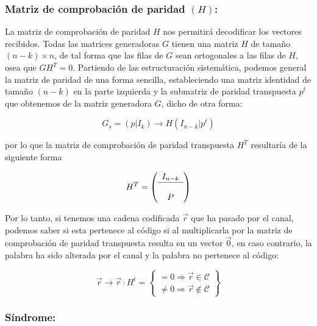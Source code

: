 \documentclass{article}
\begin{document}
\subsubsection{Matriz de comprobación de paridad $(H)$:} 

La matriz de comprobación de paridad $H$ nos permitirá decodificar los vectores recibidos. Todas las matrices generadoras $G$ tienen una matriz $H$ de tamaño $(n-k)\times n$, de tal forma que las filas de $G$ sean ortogonales a las filas de $H$, osea que $GH^T = 0$. Partiendo de las estructuración sistemática, podemos general la matriz de paridad de una forma sencilla, estableciendo una matriz identidad de tamaño $(n-k)$ en la parte izquierda y la submatriz de paridad transpuesta $p^t$ que obtenemos de la matriz generadora $G$, dicho de otra forma:

\begin{equation}
    G_s = (p|I_k) \to H(I_{n-k}|p^t)
\end{equation}

por lo que la matriz de comprobación de paridad transpuesta $H^T$ resultaría de la siguiente forma

\begin{equation}
    H^T =
    \left(
        \begin{array}{c}
            I_{n-k} \\
            \hline \\
            P 
        \end{array}
    \right)
\end{equation}

Por lo tanto, si tenemos una cadena codificada $\vec{r}$ que ha pasado por el canal, podemos saber si esta pertenece al código si al multiplicarla por la matriz de comprobación de paridad transpuesta resulta en un vector $\vec{0}$, en caso contrario, la palabra ha sido alterada por el canal y la palabra no pertenece al código:

\begin{equation}
    \vec{r} \to \vec{r}\cdot H^t =
    \left\{
        \begin{array}{c}
           = 0 \Rightarrow \vec{r} \in \mathcal{C} \\
           \neq 0 \Rightarrow \vec{r} \notin \mathcal{C}
        \end{array}
    \right\}
\end{equation}

\subsubsection{Síndrome:}
\end{document}
